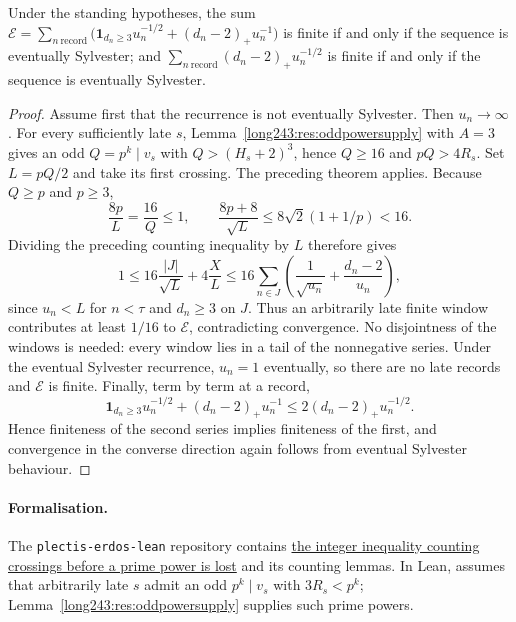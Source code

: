 \documentclass[11pt]{article}
\begin{document}
\begin{theorem}\label{long243:res:energycriterion}
Under the standing hypotheses, the sum
$\mathcal E=\sum_{n\ \mathrm{record}}\bigl(\mathbf 1_{d_n\ge3}u_n^{-1/2}
+(d_n-2)_+u_n^{-1}\bigr)$ is finite if and only if the sequence is eventually Sylvester; and
$\sum_{n\ \mathrm{record}}(d_n-2)_+u_n^{-1/2}$ is finite if and only if the sequence is eventually Sylvester.
\end{theorem}

\begin{proof}
Assume first that the recurrence is not eventually Sylvester. Then $u_n\to\infty$.
For every sufficiently late $s$, Lemma~\ref{long243:res:oddpowersupply}
with $A=3$ gives an odd $Q=p^k\mid v_s$ with
$Q>(H_s+2)^3$, hence $Q\ge16$ and $pQ>4R_s$.
Set $L=pQ/2$ and take its first crossing. The preceding theorem applies.
Because $Q\ge p$ and $p\ge3$,
\[
 \frac{8p}{L}=\frac{16}{Q}\le1,
 \qquad \frac{8p+8}{\sqrt L}
 \le8\sqrt2(1+1/p)<16.
\]
Dividing the preceding counting inequality by $L$ therefore gives
\[
 1\le16\frac{|J|}{\sqrt L}+4\frac{X}{L}
 \le16\sum_{n\in J}\left(\frac1{\sqrt{u_n}}+
                  \frac{d_n-2}{u_n}\right),
\]
since $u_n<L$ for $n<\tau$ and $d_n\ge3$ on $J$.
Thus an arbitrarily late finite window contributes at least $1/16$ to
$\mathcal E$, contradicting convergence. No disjointness of the windows is
needed: every window lies in a tail of the nonnegative series.
Under the eventual Sylvester recurrence, $u_n=1$ eventually, so there are no late records and
$\mathcal E$ is finite.
Finally, term by term at a record,
\[
 \mathbf1_{d_n\ge3}u_n^{-1/2}+(d_n-2)_+u_n^{-1}
 \le2(d_n-2)_+u_n^{-1/2}.
\]
Hence finiteness of the second series implies finiteness of the first,
and convergence in the converse direction again follows from eventual Sylvester behaviour.
\end{proof}

\paragraph{Formalisation.}
The \texttt{plectis-erdos-lean} repository contains
\href{https://github.com/wcook04/plectis-erdos-lean/blob/52f29ad173b04e3bac941b3663f2b9aebe5de0bb/ErdosProblems/Erdos243/ProtectedEpochEnergy.lean\#L185}{the integer inequality counting crossings before a prime power is lost}
and its counting lemmas.
In Lean,
assumes that arbitrarily late $s$ admit an odd $p^k\mid v_s$ with
$3R_s<p^k$; Lemma~\ref{long243:res:oddpowersupply} supplies such prime
powers.
\end{document}
